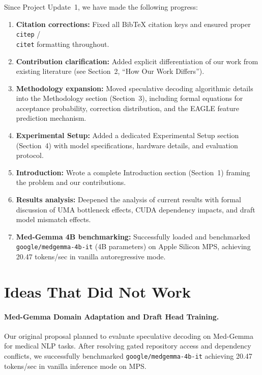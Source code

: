 \documentclass[11pt]{article}
\begin{document}
Since Project Update~1, we have made the following progress:
\begin{enumerate}
    \item \textbf{Citation corrections:} Fixed all BibTeX citation keys and ensured proper \texttt{\\citep} / \texttt{\\citet} formatting throughout.
    \item \textbf{Contribution clarification:} Added explicit differentiation of our work from existing literature (see Section~2, ``How Our Work Differs'').
    \item \textbf{Methodology expansion:} Moved speculative decoding algorithmic details into the Methodology section (Section~3), including formal equations for acceptance probability, correction distribution, and the EAGLE feature prediction mechanism.
    \item \textbf{Experimental Setup:} Added a dedicated Experimental Setup section (Section~4) with model specifications, hardware details, and evaluation protocol.
    \item \textbf{Introduction:} Wrote a complete Introduction section (Section~1) framing the problem and our contributions.
    \item \textbf{Results analysis:} Deepened the analysis of current results with formal discussion of UMA bottleneck effects, CUDA dependency impacts, and draft model mismatch effects.
    \item \textbf{Med-Gemma 4B benchmarking:} Successfully loaded and benchmarked \texttt{google/medgemma-4b-it} (4B parameters) on Apple Silicon MPS, achieving 20.47 tokens/sec in vanilla autoregressive mode.
\end{enumerate}

\section{Ideas That Did Not Work}
\label{sec:problems}

\paragraph{Med-Gemma Domain Adaptation and Draft Head Training.}
Our original proposal planned to evaluate speculative decoding on Med-Gemma \citep{medgemma2024} for medical NLP tasks. After resolving gated repository access and dependency conflicts, we successfully benchmarked \texttt{google/medgemma-4b-it} achieving 20.47 tokens/sec in vanilla inference mode on MPS. 
\end{document}
